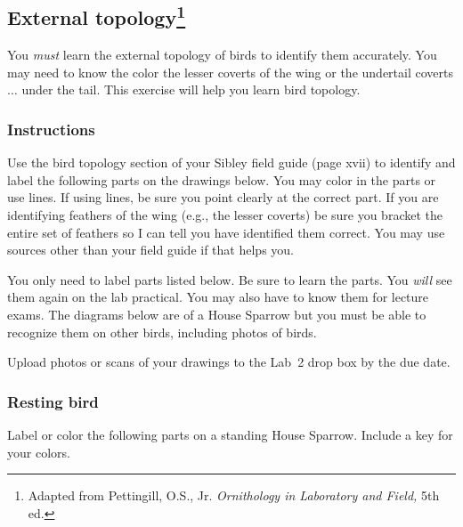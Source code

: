 \documentclass[10pt]{article}
\begin{document}
\thispagestyle{plain}

\subsection*{External topology\footnote{Adapted from Pettingill, O.S., Jr. \textit{Ornithology in Laboratory and Field,} 5th ed.}}

You \emph{must} learn the external topology of birds to 
identify them accurately. You may need to know the color 
the lesser coverts of the wing or the undertail coverts$\dots$
under the tail. This exercise will help you learn bird
topology.

\subsubsection*{Instructions}

 Use the bird topology section of your Sibley field guide (page xvii) to identify and label the following parts on the drawings below. You may color in the parts or use lines. If using lines, be sure you point clearly at the correct part. If you are identifying feathers of the wing (e.g., the lesser coverts) be sure you bracket the entire set of feathers so I can tell you have identified them correct. You may use sources other than your field guide if that helps you. 
 
 You only need to label parts listed below. Be sure to learn the parts. You \emph{will} see them again on the lab practical. You may also have to know them for lecture exams. The diagrams below are of a House Sparrow but you must be able to recognize them on other birds, including photos of birds.
 
 Upload photos or scans of your drawings to the Lab~2 drop box by the due date. 


\subsubsection*{Resting bird}

Label or color the following parts on a standing House Sparrow. Include a key for your colors.
\end{document}
